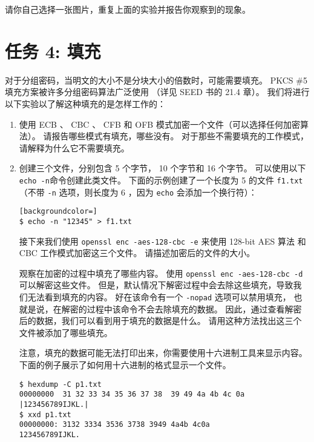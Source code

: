请你自己选择一张图片，重复上面的实验并报告你观察到的现象。




\section{任务 4: 填充}

对于分组密码，当明文的大小不是分块大小的倍数时，可能需要填充。
PKCS \#5 填充方案被许多分组密码算法广泛使用
（详见 SEED 书的 21.4 章）。
我们将进行以下实验以了解这种填充的是怎样工作的：

\begin{enumerate}
\item 使用 ECB 、 CBC 、 CFB 和 OFB 模式加密一个文件（可以选择任何加密算法）。
请报告哪些模式有填充，哪些没有。
对于那些不需要填充的工作模式，请解释为什么它不需要填充。


\item 创建三个文件，分别包含 5 个字节， 10 个字节和 16 个字节。
可以使用以下 \texttt{echo -n}命令创建此类文件。
下面的示例创建了一个长度为 5 的文件 \texttt{f1.txt}
（不带 \texttt{-n} 选项，则长度为 6 ，因为 \texttt{echo} 会添加一个换行符）：

\begin{lstlisting}[backgroundcolor=]
$ echo -n "12345" > f1.txt
\end{lstlisting}

接下来我们使用 \texttt{openssl enc -aes-128-cbc -e} 来使用 128-bit AES 算法
和 CBC 工作模式加密这三个文件。
请描述加密后的文件的大小。

观察在加密的过程中填充了哪些内容。
使用 \texttt{openssl enc -aes-128-cbc -d} 可以解密这些文件。
但是，默认情况下解密过程中会去除这些填充，导致我们无法看到填充的内容。
好在该命令有一个 \texttt{-nopad} 选项可以禁用填充，
也就是说，在解密的过程中该命令不会去除填充的数据。
因此，通过查看解密后的数据，我们可以看到用于填充的数据是什么。
请用这种方法找出这三个文件被添加了哪些填充。

注意，填充的数据可能无法打印出来，你需要使用十六进制工具来显示内容。
下面的例子展示了如何用十六进制的格式显示一个文件。

\begin{lstlisting}
$ hexdump -C p1.txt
00000000  31 32 33 34 35 36 37 38  39 49 4a 4b 4c 0a   |123456789IJKL.|
$ xxd p1.txt
00000000: 3132 3334 3536 3738 3949 4a4b 4c0a            123456789IJKL.
\end{lstlisting}

\end{enumerate}



